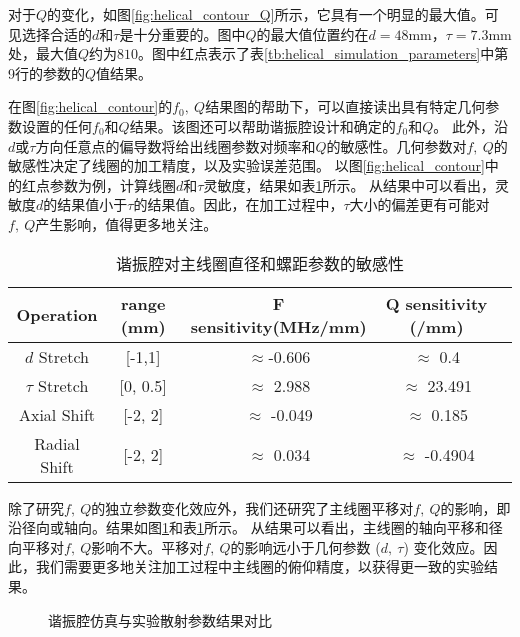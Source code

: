 对于$Q$的变化，如图\ref{fig:helical_contour_Q}所示，它具有一个明显的最大值。可见选择合适的$d$和$\tau$是十分重要的。图中$Q$的最大值位置约在$d=48$mm，$\tau=7.3$mm处，最大值$Q$约为$810$。图中红点表示了表\ref{tb:helical_simulation_parameters}中第9行的参数的$Q$值结果。

在图\ref{fig:helical_contour}的$ f_0,\ Q $结果图的帮助下，可以直接读出具有特定几何参数设置的任何$f_0$和$Q$结果。该图还可以帮助谐振腔设计和确定的$f_0$和$Q$。
此外，沿$d$或$\tau$方向任意点的偏导数将给出线圈参数对频率和$Q$的敏感性。几何参数对$f,\ Q$的敏感性决定了线圈的加工精度，以及实验误差范围。
以图\ref{fig:helical_contour}中的红点参数为例，计算线圈$d$和$\tau$灵敏度，结果如表\ref{tb:helical_d_tau_sensitivity}所示。
从结果中可以看出，灵敏度$d$的结果值小于$\tau$的结果值。因此，在加工过程中，$\tau$大小的偏差更有可能对 $f,\ Q$产生影响，值得更多地关注。

\begin{table}
    \centering
    \caption[谐振腔对主线圈直径和螺距参数的敏感性]{谐振腔对主线圈直径和螺距参数的敏感性\label{tb:helical_d_tau_sensitivity}}
    \begin{tabular}{ccccc}
        \toprule
        Operation & range (mm) & F sensitivity(MHz/mm) & Q sensitivity (/mm) \\
        \midrule
        $d$ Stretch & [-1,1] & $\approx$-0.606 & $\approx$ 0.4\\
        $\tau$ Stretch & [0, 0.5] & $\approx$ 2.988 & $\approx$ 23.491 \\
        Axial Shift & [-2, 2] & $\approx$ -0.049 & $\approx$ 0.185\\
        Radial Shift & [-2, 2] & $\approx$ 0.034 & $\approx$ -0.4904\\
        \bottomrule
    \end{tabular}
\end{table}

除了研究$f,\ Q$的独立参数变化效应外，我们还研究了主线圈平移对$f,\ Q$的影响，即沿径向或轴向。结果如图\ref{fig:helical_main_coil_compares}和表\ref{tb:helical_d_tau_sensitivity}所示。
从结果可以看出，主线圈的轴向平移和径向平移对$f,\ Q$影响不大。平移对$f,\ Q$的影响远小于几何参数 ($d,\ \tau$) 变化效应。因此，我们需要更多地关注加工过程中主线圈的俯仰精度，以获得更一致的实验结果。

\begin{figure}
    \centering
    \caption[谐振腔仿真与实验散射参数结果对比]{谐振腔仿真与实验散射参数结果对比\label{fig:helical_main_coil_compares}}
\end{figure}


